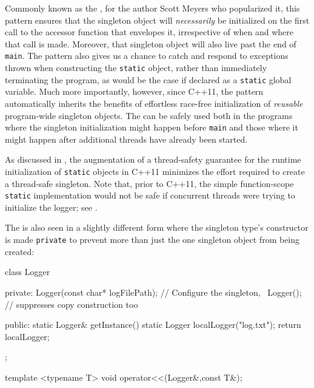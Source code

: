 \noindent Commonly known as the , for the
author Scott Meyers who popularized it, this pattern ensures that the
singleton object will \emph{necessarily} be initialized on the first
call to the accessor function that envelopes it, irrespective of when
and where that call is made. Moreover, that singleton object will also
live past the end of \lstinline!main!. The  pattern also gives us a chance to catch and respond to
exceptions thrown when constructing the \lstinline!static! object, rather
than immediately terminating the program, as would be the case if declared as a
\lstinline!static! global variable. Much more importantly, however, since C++11, the
 pattern automatically inherits the benefits of
effortless race-free initialization of \emph{reusable} program-wide
singleton objects.  The  can be safely used 
both in the programs where the singleton initialization might happen before \lstinline!main!
and those where it might happen after additional threads have already been started.

As discussed in , the augmentation of a
thread-safety guarantee for the runtime initialization of
 \lstinline!static! objects in C++11 minimizes the
effort required to create a thread-safe singleton.  Note that, prior to C++11,
the simple function-scope \lstinline!static!
implementation would not be safe if concurrent threads were trying to
initialize the logger; see .

The  is also seen in a slightly different form
where the singleton type's constructor is made \lstinline!private! to
prevent more than just the one singleton object from being created:

\begin{emcppslisting}[emcppsbatch=e10]
class Logger
{
private:
    Logger(const char* logFilePath);  // Configure the singleton,
    ~Logger();                        // suppresses copy construction too

public:
    static Logger& getInstance()
    {
        static Logger localLogger("log.txt");
        return localLogger;
    }
};
\end{emcppslisting}
\begin{emcppshiddenlisting}[emcppsbatch=e10]
template <typename T>
void operator<<(Logger&,const T&);
\end{emcppshiddenlisting}

